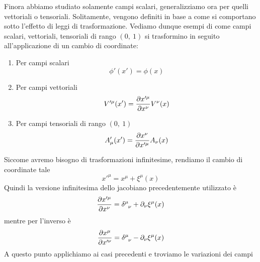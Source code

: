     Finora abbiamo studiato solamente campi scalari, generalizziamo ora per quelli vettoriali o tensoriali. Solitamente, vengono definiti in base a come si comportano sotto l'effetto di leggi di trasformazione. Vediamo dunque esempi di come campi scalari, vettoriali, tensoriali di rango $(0,~1)$ si trasformino in seguito all'applicazione di un cambio di coordinate:
    \begin{enumerate}
        \item Per campi scalari
    \begin{equation*}
        \phi'(x') = \phi(x)
    \end{equation*}
        \item Per campi vettoriali
    \begin{equation*}
        V'^\mu(x') = \frac{\partial x'^\mu}{\partial x^\nu} V^\nu(x)
    \end{equation*}
        \item Per campi tensoriali di rango $(0,~1)$
    \begin{equation*}
        A'_\mu(x') = \frac{\partial x^\nu}{\partial x'^\mu} A_\nu(x)
    \end{equation*}
    \end{enumerate} 
        Siccome avremo bisogno di trasformazioni infinitesime, rendiamo il cambio di coordinate tale 
    \begin{equation*}
        x'^\mu = x^\mu + \xi^\mu(x)
    \end{equation*}
        Quindi la versione infinitesima dello jacobiano precedentemente utilizzato è 
    \begin{equation*}
        \pdv{x'^\mu}{x^\nu} = \delta^{\mu}_{\phantom \mu \nu} + \partial_\nu \xi^\mu(x)
    \end{equation*}
        mentre per l'inverso è 
    \begin{equation*}
        \pdv{x^\mu}{x'^\nu} = \delta^{\mu}_{\phantom \mu \nu} - \partial_\nu \xi^\mu(x)
    \end{equation*}
        A questo punto applichiamo ai casi precedenti e troviamo le variazioni dei campi
